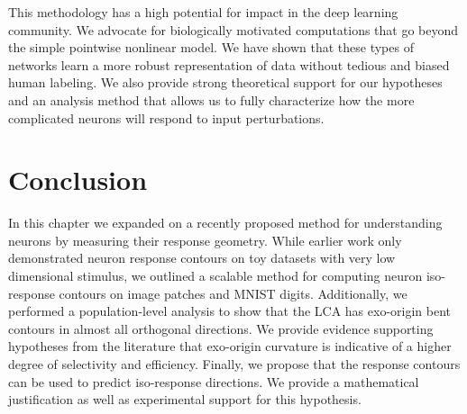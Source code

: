This methodology has a high potential for impact in the deep learning community. We advocate for biologically motivated computations that go beyond the simple pointwise nonlinear model. We have shown that these types of networks learn a more robust representation of data without tedious and biased human labeling. We also provide strong theoretical support for our hypotheses and an analysis method that allows us to fully characterize how the more complicated neurons will respond to input perturbations.

\section{Conclusion}
In this chapter we expanded on a recently proposed method for understanding neurons by measuring their response geometry. While earlier work only demonstrated neuron response contours on toy datasets with very low dimensional stimulus, we outlined a scalable method for computing neuron iso-response contours on image patches and MNIST digits. Additionally, we performed a population-level analysis to show that the LCA has exo-origin bent contours in almost all orthogonal directions. We provide evidence supporting hypotheses from the literature that exo-origin curvature is indicative of a higher degree of selectivity and efficiency. Finally, we propose that the response contours can be used to predict iso-response directions. We provide a mathematical justification as well as experimental support for this hypothesis.